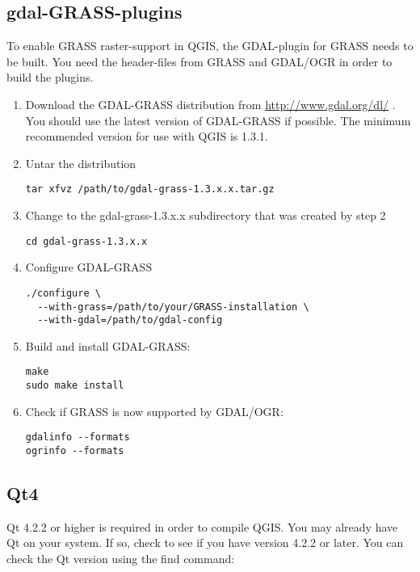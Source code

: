 %
%
\subsection{gdal-GRASS-plugins}\label{label_gdal_GRASS}
To enable GRASS raster-support in QGIS, the GDAL-plugin for GRASS needs to be built.
You need the header-files from GRASS and GDAL/OGR in order to build the plugins.

\begin{enumerate}
\item Download the GDAL-GRASS distribution from
\url{http://www.gdal.org/dl/} \cite{OGRweb}. You should use the latest
version of GDAL-GRASS if possible. The minimum recommended version for use
with QGIS \CURRENT is 1.3.1.

\item Untar the distribution 
\begin{verbatim}
tar xfvz /path/to/gdal-grass-1.3.x.x.tar.gz
\end{verbatim}

\item Change to the gdal-grass-1.3.x.x subdirectory that was created by step 2
\begin{verbatim}
cd gdal-grass-1.3.x.x
\end{verbatim}

\item Configure GDAL-GRASS
\begin{verbatim}
./configure \
  --with-grass=/path/to/your/GRASS-installation \
  --with-gdal=/path/to/gdal-config
\end{verbatim}

\item Build and install GDAL-GRASS:
\begin{verbatim}
make
sudo make install
\end{verbatim}

\item Check if GRASS is now supported by GDAL/OGR:
\begin{verbatim}
gdalinfo --formats
ogrinfo --formats
\end{verbatim}

\end{enumerate}

%
%
\subsection{Qt4}\label{label_qt}

Qt 4.2.2 or higher is required in order to compile QGIS. You may already
have Qt on your system. If so, check to see if you have version 4.2.2 or
later. You can check the Qt version using the find command:

